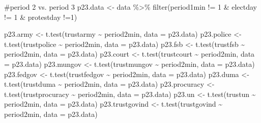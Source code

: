 \documentclass[
  letterpaper,
  DIV=11,
  numbers=noendperiod]{scrartcl}
\newenvironment{Shaded}{\begin{snugshade}}{\end{snugshade}}
\newcommand{\AttributeTok}[1]{\textcolor[rgb]{0.40,0.45,0.13}{#1}}
\newcommand{\CommentTok}[1]{\textcolor[rgb]{0.37,0.37,0.37}{#1}}
\newcommand{\DecValTok}[1]{\textcolor[rgb]{0.68,0.00,0.00}{#1}}
\newcommand{\FunctionTok}[1]{\textcolor[rgb]{0.28,0.35,0.67}{#1}}
\newcommand{\NormalTok}[1]{\textcolor[rgb]{0.00,0.23,0.31}{#1}}
\newcommand{\OtherTok}[1]{\textcolor[rgb]{0.00,0.23,0.31}{#1}}
\newcommand{\SpecialCharTok}[1]{\textcolor[rgb]{0.37,0.37,0.37}{#1}}
\begin{document}
\begin{Shaded}
\begin{Highlighting}[]
\CommentTok{\#period 2 vs. period 3}
\NormalTok{p23.data }\OtherTok{\textless{}{-}}\NormalTok{ data }\SpecialCharTok{\%\textgreater{}\%} \FunctionTok{filter}\NormalTok{(period1min }\SpecialCharTok{!=} \DecValTok{1} \SpecialCharTok{\&}\NormalTok{ electday }\SpecialCharTok{!=} \DecValTok{1} \SpecialCharTok{\&}\NormalTok{ protestday }\SpecialCharTok{!=}\DecValTok{1}\NormalTok{)}

\NormalTok{p23.army }\OtherTok{\textless{}{-}} \FunctionTok{t.test}\NormalTok{(trustarmy }\SpecialCharTok{\textasciitilde{}}\NormalTok{ period2min, }\AttributeTok{data =}\NormalTok{ p23.data)}
\NormalTok{p23.police }\OtherTok{\textless{}{-}} \FunctionTok{t.test}\NormalTok{(trustpolice }\SpecialCharTok{\textasciitilde{}}\NormalTok{ period2min, }\AttributeTok{data =}\NormalTok{ p23.data)}
\NormalTok{p23.fsb }\OtherTok{\textless{}{-}} \FunctionTok{t.test}\NormalTok{(trustfsb }\SpecialCharTok{\textasciitilde{}}\NormalTok{ period2min, }\AttributeTok{data =}\NormalTok{ p23.data)}
\NormalTok{p23.court }\OtherTok{\textless{}{-}} \FunctionTok{t.test}\NormalTok{(trustcourt }\SpecialCharTok{\textasciitilde{}}\NormalTok{ period2min, }\AttributeTok{data =}\NormalTok{ p23.data)}
\NormalTok{p23.mungov }\OtherTok{\textless{}{-}} \FunctionTok{t.test}\NormalTok{(trustmungov }\SpecialCharTok{\textasciitilde{}}\NormalTok{ period2min, }\AttributeTok{data =}\NormalTok{ p23.data)}
\NormalTok{p23.fedgov }\OtherTok{\textless{}{-}} \FunctionTok{t.test}\NormalTok{(trustfedgov }\SpecialCharTok{\textasciitilde{}}\NormalTok{ period2min, }\AttributeTok{data =}\NormalTok{ p23.data)}
\NormalTok{p23.duma }\OtherTok{\textless{}{-}} \FunctionTok{t.test}\NormalTok{(trustduma }\SpecialCharTok{\textasciitilde{}}\NormalTok{ period2min, }\AttributeTok{data =}\NormalTok{ p23.data)}
\NormalTok{p23.procuracy }\OtherTok{\textless{}{-}} \FunctionTok{t.test}\NormalTok{(trustprocuracy }\SpecialCharTok{\textasciitilde{}}\NormalTok{ period2min, }\AttributeTok{data =}\NormalTok{ p23.data)}
\NormalTok{p23.un }\OtherTok{\textless{}{-}} \FunctionTok{t.test}\NormalTok{(trustun }\SpecialCharTok{\textasciitilde{}}\NormalTok{ period2min, }\AttributeTok{data =}\NormalTok{ p23.data)}
\NormalTok{p23.trustgovind }\OtherTok{\textless{}{-}} \FunctionTok{t.test}\NormalTok{(trustgovind }\SpecialCharTok{\textasciitilde{}}\NormalTok{ period2min, }\AttributeTok{data =}\NormalTok{ p23.data)}
\end{Highlighting}
\end{Shaded}
\end{document}
